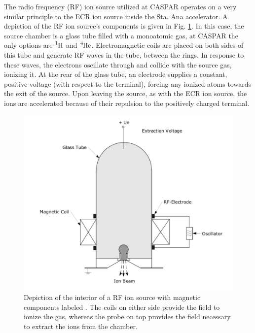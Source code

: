 The radio frequency (RF) ion source utilized at CASPAR operates on a very similar principle to the ECR ion source inside the Sta. Ana accelerator. A depiction of the RF ion source's components is given in Fig. \ref{fig: rfis}. In this case, the source chamber is a glass tube filled with a monoatomic gas, at CASPAR the only options are $\ce{^{1}H}$ and $\ce{^{4}He}$.  Electromagnetic coils are placed on both sides of this tube and generate RF waves in the tube, between the rings. In response to these waves, the electrons oscillate through and collide with the source gas, ionizing it. At the rear of the glass tube, an electrode supplies a constant, positive voltage (with respect to the terminal), forcing any ionized atoms towards the exit of the source. Upon leaving the source, as with the ECR ion source, the ions are accelerated because of their repulsion to the positively charged terminal. 

\begin{figure}
\includegraphics[width=\linewidth]{figures/rfSchematic.png}
\caption{Depiction of the interior of a RF ion source with magnetic components labeled \cite{Li2015}. The coils on either side provide the field to ionize the gas, whereas the probe on top provides the field necessary to extract the ions from the chamber.}
\label{fig: rfis}
\end{figure}

